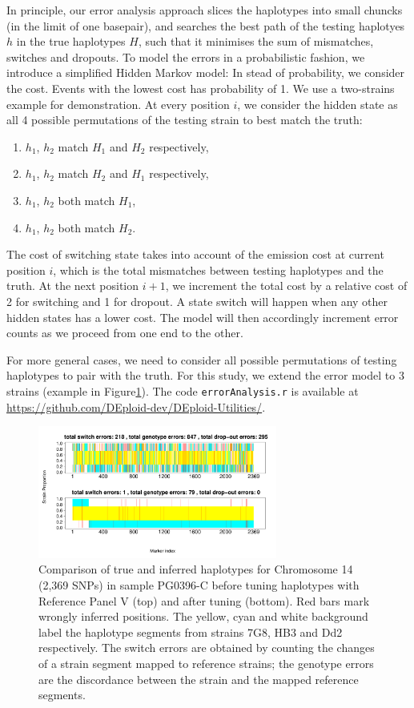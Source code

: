 \documentclass[9pt]{article}
\begin{document}
In principle, our error analysis approach slices the haplotypes into small chuncks (in the limit of one basepair), and searches the best path of the testing haplotyes $h$ in the true haplotypes $H$, such that it minimises the sum of mismatches, switches and dropouts. To model the errors in a probabilistic fashion, we introduce a simplified Hidden Markov model: In stead of probability, we consider the cost. Events with the lowest cost has probability of 1. We use a two-strains example for demonstration. At every position $i$, we consider the hidden state as all 4 possible permutations of the testing strain to best match the truth:
\begin{enumerate}
  \item $h_{1}$, $h_{2}$ match $H_{1}$ and $H_{2}$ respectively,
  \item $h_{1}$, $h_{2}$ match $H_{2}$ and $H_{1}$ respectively,
  \item $h_{1}$, $h_{2}$ both match $H_{1}$,
  \item $h_{1}$, $h_{2}$ both match $H_{2}$.
\end{enumerate}
The cost of switching state takes into account of the emission cost at current position $i$, which is the total mismatches between testing haplotypes and the truth. At the next position $i+1$, we increment the total cost by a relative cost of 2 for switching and 1 for dropout. A state switch will happen when any other hidden states has a lower cost. The model will then accordingly increment error counts as we proceed from one end to the other.

For more general cases, we need to consider all possible permutations of testing haplotypes to pair with the truth. For this study, we extend the error model to 3 strains (example in Figure\ref{fig:error}). The code {\tt errorAnalysis.r} is available at \url{https://github.com/DEploid-dev/DEploid-Utilities/}.

\begin{figure}[htp]
  \centering
    \includegraphics[width=0.7\textwidth]{DEploid_IBD_haps_compare.pdf}
  \caption{Comparison of true and inferred haplotypes for Chromosome 14 (2,369 SNPs) in sample PG0396-C before tuning haplotypes with Reference Panel V (top) and after tuning (bottom). Red bars mark wrongly inferred positions. The yellow, cyan and white background label the haplotype segments from strains 7G8, HB3 and Dd2 respectively. The switch errors are obtained by counting the changes of a strain segment mapped to reference strains; the genotype errors are the discordance between the strain and the mapped reference segments.
  }
  \label{fig:error}
\end{figure}
\end{document}
